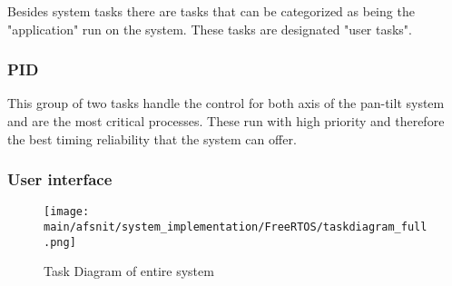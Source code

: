 \documentclass[../../../main]{subfiles}
\begin{document}
Besides system tasks there are tasks that can be categorized as being the "application" run on the system. These tasks are designated "user tasks".

\subsubsection{PID}

This group of two tasks handle the control for both axis of the pan-tilt system and are the most critical processes. These run with high priority and therefore the best timing reliability that the system can offer.

\subsubsection{User interface}


\begin{figure}[H]
\texttt{[image: \\main/afsnit/system\_implementation/FreeRTOS/taskdiagram\_full.png]}
\caption{Task Diagram of entire system}
\label{fig:entire_task_diagram}
\end{figure}
\end{document}
